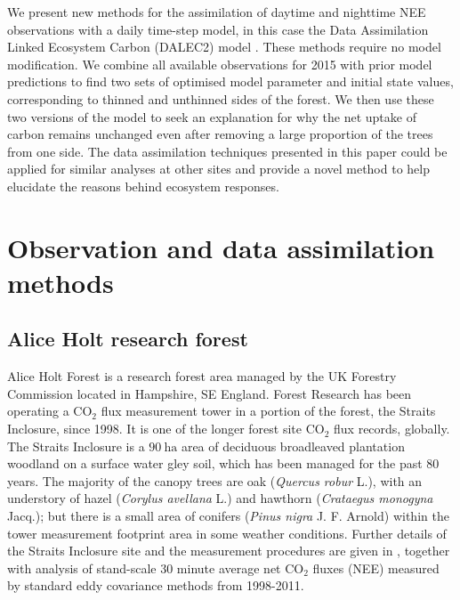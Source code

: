 \documentclass[12pt]{article}
\begin{document}
We present new methods for the assimilation of daytime and nighttime NEE observations with a daily time-step model, in this case the Data Assimilation Linked Ecosystem Carbon (DALEC2) model \citep{Bloom2015}. These methods require no model modification. We combine all available observations for 2015 with prior model predictions to find two sets of optimised model parameter and initial state values, corresponding to thinned and unthinned sides of the forest. We then use these two versions of the model to seek an explanation for why the net uptake of carbon remains unchanged even after removing a large proportion of the trees from one side. The data assimilation techniques presented in this paper could be applied for similar analyses at other sites and provide a novel method to help elucidate the reasons behind ecosystem responses.      

\section{Observation and data assimilation methods}

\subsection{Alice Holt research forest} \label{sec:site_description}

Alice Holt Forest is a research forest area managed by the UK Forestry Commission located in Hampshire, SE England. Forest Research has been operating a $\text{CO}_{2}$ flux measurement tower in a portion of the forest, the Straits Inclosure, since 1998. It is one of the longer forest site $\text{CO}_2$ flux records, globally. The Straits Inclosure is a $90~\text{ha}$ area of deciduous broadleaved plantation woodland on a surface water gley soil, which has been managed for the past 80 years. The majority of the canopy trees are oak (\textit{Quercus robur} L.), with an understory of hazel (\textit{Corylus avellana} L.) and hawthorn (\textit{Crataegus monogyna} Jacq.); but there is a small area of conifers (\textit{Pinus nigra} J. F. Arnold) within the tower measurement footprint area in some weather conditions. Further details of the Straits Inclosure site and the measurement procedures are given in \citet{wilkinson2012inter}, together with analysis of stand-scale $30$ minute average net $\text{CO}_{2}$ fluxes (NEE) measured by standard eddy covariance methods from 1998-2011. 
\end{document}
